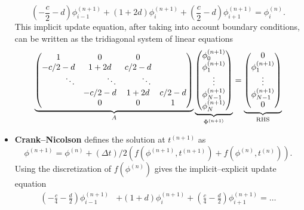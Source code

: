 \documentclass[reqno, 12pt]{amsart}
\begin{document}
\begin{itemize}
        \begin{equation*}
            \left(-\frac{c}{2}-d\right)\phi^{(n+1)}_{i-1} + \left(1 + 2d\right)\phi^{(n+1)}_i + \left(\frac{c}{2} - d\right)\phi^{(n+1)}_{i + 1} = \phi^{(n)}_i.
        \end{equation*}
        This implicit update equation, after taking into account boundary conditions, can be written as the tridiagonal system of linear equations
        \begin{equation*}
            \underbrace{
            \begin{pmatrix}
                1 & 0 & 0 \\
                -c/2 - d & 1 + 2d & c/2 - d \\
                \hfill \ddots & \hfill \ddots & \hfill \ddots \\
                & -c/2 - d & 1 + 2d & c/2 - d \\
                & 0 & 0 & 1
            \end{pmatrix}}_{A}
            \underbrace{
            \begin{pmatrix}
                \phi_0^{(n+1)} \\
                \phi_1^{(n+1)} \\ 
                \vdots \\
                \phi_{N-1}^{(n+1)} \\
                \phi_{N}^{(n+1)}
        \end{pmatrix}}_{\Phi^{(n+1)}}
            =
            \underbrace{
            \begin{pmatrix}
                0 \\
                \phi_1^{(n+1)} \\ 
                \vdots \\
                \phi_{N-1}^{(n+1)} \\
                0
        \end{pmatrix}}_{\text{RHS}}
        \end{equation*}
    \item \textbf{Crank--Nicolson} defines the solution at $t^{(n+1)}$ as
        \[\phi^{(n+1)} = \phi^{(n)} + (\Delta t)/2\left(f(\phi^{(n+1)},t^{(n+1)}) + f(\phi^{(n)}, t^{(n)})\right).\]
        Using the discretization of $f(\phi^{(n)})$ gives the implicit--explicit update equation
        \begin{align*}
            \left(-\frac{c}{4}-\frac{d}{2}\right)\phi^{(n+1)}_{i-1} &+ \left(1 + d\right)\phi^{(n+1)}_i + \left(\frac{c}{4} - \frac{d}{2}\right)\phi^{(n+1)}_{i + 1} = \dots\\

\end{align*}
\end{itemize}
\end{document}
